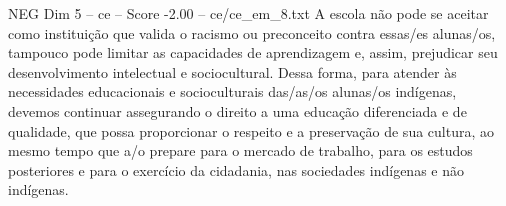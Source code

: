 \begin{textsample}{NEG Dim 5 – ce – Score -2.00 – ce/ce\_em\_8.txt}
A escola não pode se aceitar como instituição que valida o racismo ou preconceito contra essas/es alunas/os, tampouco pode limitar as capacidades de aprendizagem e, assim, prejudicar seu desenvolvimento intelectual e sociocultural.
Dessa forma, para atender às necessidades educacionais e socioculturais das/as/os alunas/os indígenas, devemos continuar assegurando o direito a uma educação diferenciada e de qualidade, que possa proporcionar o respeito e a preservação de sua cultura, ao mesmo tempo que a/o prepare para o mercado de trabalho, para os estudos posteriores e para o exercício da cidadania, nas sociedades indígenas e não indígenas.

\end{textsample}

